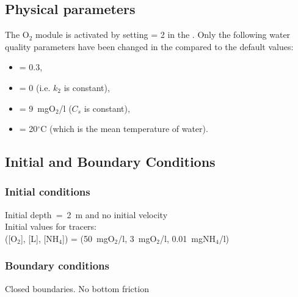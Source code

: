 \subsection{Physical parameters}
%
The O$_2$ module is activated by setting  = 2
in the  .
%
Only the following water quality parameters have been changed
in the \waqtel {} compared to the default values:
\begin{itemize}
\item {} = 0.3,
\item {} = 0 (i.e. $k_2$ is constant),
\item {} = 9~mgO$_2$/l ($C_s$ is constant),
\item {} = 20$^\circ$C (which is the mean temperature of water).
\end{itemize}
%
%
%
%
%
%
\subsection{Initial and Boundary Conditions}
%
\subsubsection{Initial conditions}
%
Initial depth~=~2~m
and no initial velocity\\
Initial values for tracers:\\
([O$_2$], [L], [NH$_4$]) =
(50~mgO$_2$/l, 3~mgO$_2$/l, 0.01~mgNH$_4$/l)
%
\subsubsection{Boundary conditions}
%
Closed boundaries. No bottom friction
%
